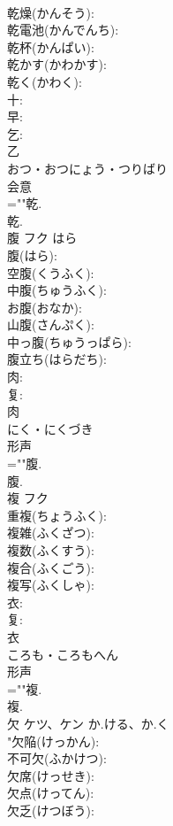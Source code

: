 \documentclass[8pt]{extreport}
\begin{document}
\begin{CJK}{UTF8}{min}
\\	乾燥(かんそう): 
\\	乾電池(かんでんち): 
\\	乾杯(かんぱい): 
\\	乾かす(かわかす): 
\\	乾く(かわく): 
\\	十: 
\\	早: 
\\	乞: 
\\	乙	
\\	おつ・おつにょう・つりばり	
\\	会意 
\\	=""乾.
\\	乾.
\\	腹	フク	はら		
\\	腹(はら): 
\\	空腹(くうふく): 
\\	中腹(ちゅうふく): 
\\	お腹(おなか): 
\\	山腹(さんぷく): 
\\	中っ腹(ちゅうっぱら): 
\\	腹立ち(はらだち): 
\\	肉: 
\\	复: 
\\	肉	
\\	にく・にくづき	
\\	形声 
\\	=""腹.
\\	腹.
\\	複	フク			
\\	重複(ちょうふく): 
\\	複雑(ふくざつ): 
\\	複数(ふくすう): 
\\	複合(ふくごう): 
\\	複写(ふくしゃ): 
\\	衣: 
\\	复: 
\\	衣	
\\	ころも・ころもへん	
\\	形声 
\\	=""複.
\\	複.
\\	欠	ケツ、ケン	か.ける、か.く		
\\	"欠陥(けっかん): 
\\	不可欠(ふかけつ): 
\\	欠席(けっせき): 
\\	欠点(けってん): 
\\	欠乏(けつぼう): 

\end{CJK}
\end{document}
